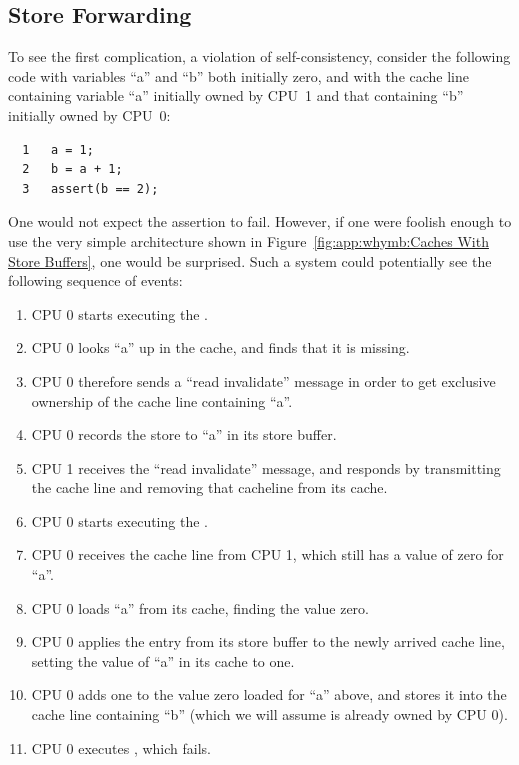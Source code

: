 \subsection{Store Forwarding}
\label{sec:app:whymb:Store Forwarding}

To see the first complication, a violation of self-consistency,
consider the following code with variables ``a'' and ``b'' both initially
zero, and with the cache line containing variable ``a'' initially
owned by CPU~1 and that containing ``b'' initially owned by CPU~0:

\vspace{5pt}
\begin{minipage}[t]{\columnwidth}
\small
\begin{verbatim}
  1   a = 1;
  2   b = a + 1;
  3   assert(b == 2);
\end{verbatim}
\end{minipage}
\vspace{5pt}

One would not expect the assertion to fail.
However, if one were foolish enough to use the very simple architecture
shown in
Figure~\ref{fig:app:whymb:Caches With Store Buffers},
one would be surprised.
Such a system could potentially see the following sequence of events:
\begin{enumerate}
\item	CPU 0 starts executing the .
\item	CPU 0 looks ``a'' up in the cache, and finds that it is missing.
\item	CPU 0 therefore sends a ``read invalidate'' message in order to
	get exclusive ownership of the cache line containing ``a''.
\item	CPU 0 records the store to ``a'' in its store buffer.
\item	CPU 1 receives the ``read invalidate'' message, and responds
	by transmitting the cache line and removing that cacheline from
	its cache.
\item	CPU 0 starts executing the .
\item	CPU 0 receives the cache line from CPU 1, which still has
	a value of zero for ``a''.
\item	CPU 0 loads ``a'' from its cache, finding the value zero.
	\label{item:app:whymb:Need Store Buffer}
\item	CPU 0 applies the entry from its store buffer to the newly
	arrived cache line, setting the value of ``a'' in its cache
	to one.
\item	CPU 0 adds one to the value zero loaded for ``a'' above,
	and stores it into the cache line containing ``b''
	(which we will assume is already owned by CPU 0).
\item	CPU 0 executes , which fails.
\end{enumerate}

